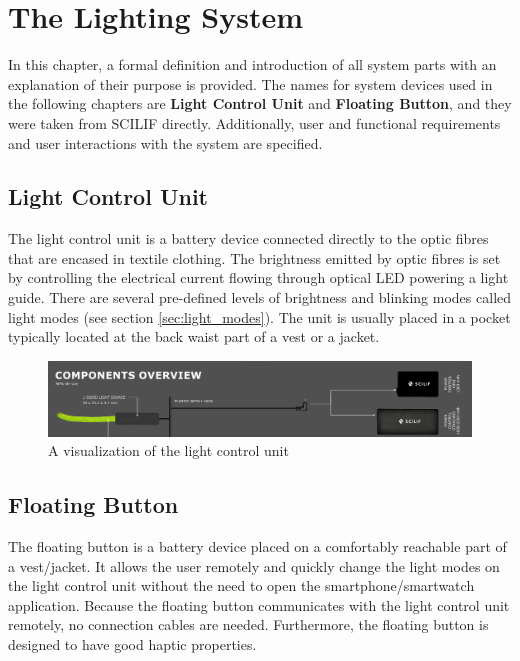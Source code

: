 \chapter{The Lighting System}
    In this chapter, a formal definition and introduction of all system parts with an explanation of their purpose is provided. The names for system devices used in the following chapters are \textbf{Light Control Unit} and \textbf{Floating Button}, and they were taken from SCILIF directly.
    Additionally, user and functional requirements and user interactions with the system are specified.
    
    \section{Light Control Unit}
        \label{sec:urs_lcu}
        The light control unit is a battery device connected directly to the optic fibres that are encased in textile clothing. The brightness emitted by optic fibres is set by controlling the electrical current flowing through optical LED powering a light guide. There are several pre-defined levels of brightness and blinking modes called light modes (see section \ref{sec:light_modes}).
        The unit is usually placed in a pocket typically located at the back waist part of a vest or a jacket.
        
        \begin{figure}[!ht]
            \centering
    	    \includegraphics[width =1.1\textwidth]{URS/Figs/scilif_system01.png}
            \caption {A visualization of the light control unit}
            \label{figure:scilif_lcu}
        \end{figure}  
        
        
    \section{Floating Button}
        \label{sec:urs_fb}
         The floating button is a battery device placed on a comfortably reachable part of a vest/jacket. It allows the user remotely and quickly change the light modes on the light control unit without the need to open the smartphone/smartwatch application. Because the floating button communicates with the light control unit remotely, no connection cables are needed. Furthermore, the floating button is designed to have good haptic properties. 
       
